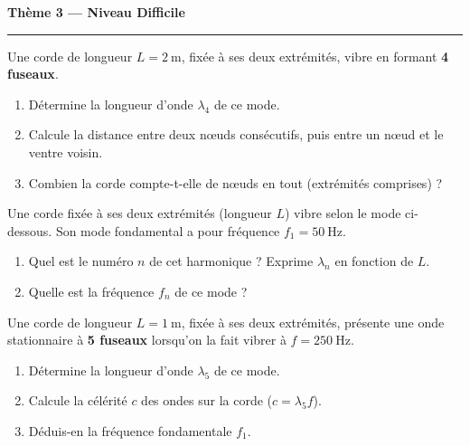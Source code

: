 \documentclass[11pt,a4paper]{article}
\begin{document}
\begin{center}
{\large\bfseries\color{primarydark} Thème 3 — Niveau Difficile}\\[-2pt]
{\color{primary}\rule{5cm}{1pt}}
\end{center}

\begin{exo}
Une corde de longueur $L=\SI{2}{\metre}$, fixée à ses deux extrémités, vibre en formant
\textbf{4 fuseaux}.
\begin{enumerate}[label=\alph*)]
  \item Détermine la longueur d'onde $\lambda_4$ de ce mode.
  \item Calcule la distance entre deux nœuds consécutifs, puis entre un nœud et le ventre voisin.
  \item Combien la corde compte-t-elle de nœuds en tout (extrémités comprises) ?
\end{enumerate}
\end{exo}

\begin{exo}
Une corde fixée à ses deux extrémités (longueur $L$) vibre selon le mode ci-dessous. Son mode
fondamental a pour fréquence $f_1=\SI{50}{\hertz}$.
\begin{center}
\end{center}
\begin{enumerate}[label=\alph*)]
  \item Quel est le numéro $n$ de cet harmonique ? Exprime $\lambda_n$ en fonction de $L$.
  \item Quelle est la fréquence $f_n$ de ce mode ?
\end{enumerate}
\end{exo}

\begin{exo}
Une corde de longueur $L=\SI{1}{\metre}$, fixée à ses deux extrémités, présente une onde
stationnaire à \textbf{5 fuseaux} lorsqu'on la fait vibrer à $f=\SI{250}{\hertz}$.
\begin{enumerate}[label=\alph*)]
  \item Détermine la longueur d'onde $\lambda_5$ de ce mode.
  \item Calcule la célérité $c$ des ondes sur la corde ($c=\lambda_5 f$).
  \item Déduis-en la fréquence fondamentale $f_1$.
\end{enumerate}
\end{exo}
\end{document}
